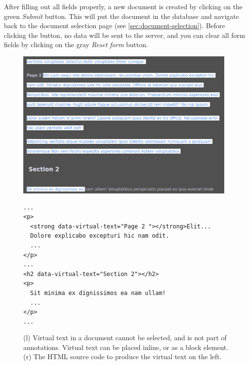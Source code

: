 After filling out all fields properly, a new document is created by clicking on the green \emph{Submit} button.
This will put the document in the database and navigate back to the document selection page (see \cref{sec:document-selection}).
Before clicking the button, no data will be sent to the server, and you can clear all form fields by clicking on the gray \emph{Reset form} button.


\begin{figure}[htb]
  \centering
  \begin{minipage}{6cm}
    \includegraphics[width=\textwidth]{../src/assets/annotator-documentation/virtual-text.png}
  \end{minipage}%
  \quad%
  \begin{minipage}{9cm}
    \begin{lstlisting}
...
<p>
  <strong data-virtual-text="Page 2 "></strong>Elit...
  Dolore explicabo excepturi hic nam odit.
  ...
</p>
...
<h2 data-virtual-text="Section 2"></h2>
<p>
  Sit minima ex dignissimos ea nam ullam!
  ...
</p>
...
    \end{lstlisting}
  \end{minipage}

  \caption{
    (l) Virtual text in a document cannot be selected, and is not part of annotations.
    Virtual text can be placed inline, or as a block element.
    (r) The HTML source code to produce the virtual text on the left.
  }
  \label{fig:virtual-text}
\end{figure}


